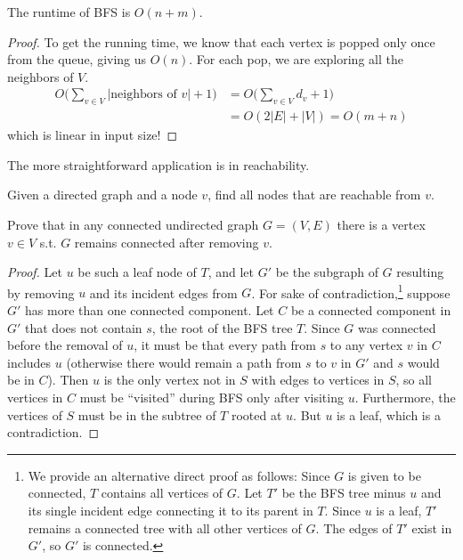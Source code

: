 \documentclass{article}
\begin{document}
    \begin{theorem}
      The runtime of BFS is $O(n+m)$. 
    \end{theorem}
    \begin{proof}
      To get the running time, we know that each vertex is popped only once from the queue, giving us $O(n)$. For each pop, we are exploring all the neighbors of $V$. 
      \begin{align}
        O \bigg( \sum_{v \in V} | \text{neighbors of } v| + 1\bigg) & = O \bigg( \sum_{v \in V} d_v + 1 \bigg) \\
                                             & = O (2 |E| + |V|) = O(m + n )
      \end{align}
      which is linear in input size!  
    \end{proof}

    The more straightforward application is in reachability. 

    \begin{example}[Reachability]
      Given a directed graph and a node $v$, find all nodes that are reachable from $v$. 
    \end{example}

    \begin{exercise}
      Prove that in any connected undirected graph $G = (V, E)$ there is a vertex $v \in V$ s.t. $G$ remains connected after removing $v$. 
    \end{exercise}
    \begin{proof}
      Let $u$ be such a leaf node of $T$, and let $G'$ be the subgraph of $G$ resulting by removing $u$ and its incident edges from $G$.
      For sake of contradiction,\footnote{We provide an alternative direct proof as follows: Since $G$ is given to be connected, $T$ contains all vertices of $G$. Let $T'$ be the BFS tree minus $u$ and its single incident edge connecting it to its parent in $T$. Since $u$ is a leaf, $T'$ remains a connected tree with all other vertices of $G$. The edges of $T'$ exist in $G'$, so $G'$ is connected.} suppose $G'$ has more than one connected component.
      Let $C$ be a connected component in $G'$ that does not contain $s$, the root of the BFS tree $T$.
      Since $G$ was connected before the removal of $u$, it must be that every path from $s$ to any vertex $v$ in $C$ includes $u$ (otherwise there would remain a path from $s$ to $v$ in $G'$ and $s$ would be in $C$).
      Then $u$ is the only vertex not in $S$ with edges to vertices in $S$, so all vertices in $C$ must be ``visited'' during BFS only after visiting $u$. Furthermore, the vertices of $S$ must be in the subtree of $T$ rooted at $u$. But $u$ is a leaf, which is a contradiction.
    \end{proof}
\end{document}
